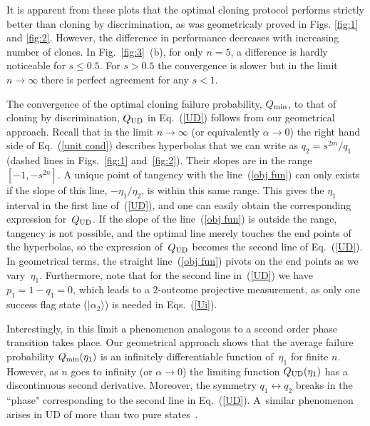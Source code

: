 \documentclass[aps,prl,twocolumn,showpacs]{revtex4}
\begin{document}
It is apparent from these plots that the optimal cloning protocol performs strictly better than cloning by discrimination, as was geometricaly proved in Figs. \ref{fig:1} and \ref{fig:2}. However, the difference in performance decreases with increasing number of clones. In Fig.~\ref{fig:3}~(b), for only $n=5$, a difference is hardly noticeable for $s\le 0.5$. For $s > 0.5$ the convergence is slower but in the limit $n\to\infty$ there is perfect agreement for any $s<1$.

The convergence of the optimal cloning failure probability, $Q_{\rm min}$, to that of cloning by discrimination, $Q_{\rm UD}$ in Eq.~(\ref{UD})
follows from our geometrical approach. Recall that in the limit $n\to\infty$ (or equivalently $\alpha\to0$)  the right hand side of Eq.~(\ref{unit cond}) describes hyperbolas that we can write as $q_2=s^{2m}/q_1$ (dashed lines in Figs.~\ref{fig:1} and~\ref{fig:2}). Their  slopes are in the range $[-1,-s^{2n}]$.  A unique point of tangency with the line~(\ref{obj fun}) can only exists if the slope of this line, $-\eta_1/\eta_2$, is within this same range. This gives the $\eta_1$ interval in the first line of~(\ref{UD}), and one can easily obtain the corresponding expression for~$Q_{\rm UD}$.
%
If the slope of the line~(\ref{obj fun}) is outside the range, tangency is not possible, and the optimal line merely touches the end points of the hyperbolas, so the expression of~$Q_{\rm UD}$ becomes the second line of Eq.~(\ref{UD}). In geometrical terms, the straight line~(\ref{obj fun}) pivots on the end points as we vary~$\eta_1$. Furthermore, note that for the second line in~(\ref{UD}) we have $p_1=1-q_1=0$, which leads to a $2$-outcome projective measurement, as only one success flag state ($|\alpha_2\rangle$) is needed in Eqs.~(\ref{Ui}). 

Interestingly, in this limit a phenomenon analogous to a second order phase transition takes place. Our geometrical approach shows that the average failure probability $Q_{\rm min}(\eta_1)$ is an infinitely differentiable function of~$\eta_1$ for finite $n$. However, as $n$ goes to infinity (or $\alpha\to0$) the limiting function $Q_{\rm UD}(\eta_1)$ has a discontinuous second derivative. Moreover, the symmetry $q_1\leftrightarrow q_2$ breaks  in the ``phase" corresponding to the second line in Eq.~(\ref{UD}). A~similar phenomenon arises in UD of more than two pure states~\cite{Bergou1}.
\end{document}
